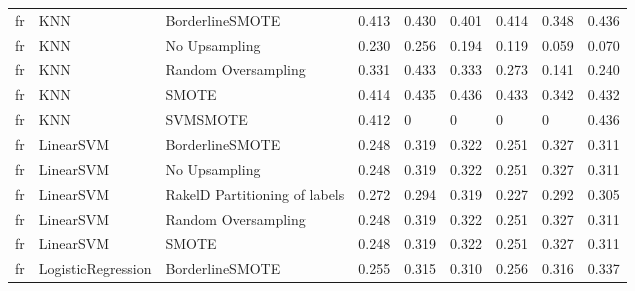 \begin{tabular}{lllllllll}
      fr &                             KNN &               BorderlineSMOTE & 0.413 &                     0.430 &                 0.401 &                  0.414 &                                   0.348 &     0.436 \\
      fr &                             KNN &                 No Upsampling & 0.230 &                     0.256 &                 0.194 &                  0.119 &                                   0.059 &     0.070 \\
      fr &                             KNN &           Random Oversampling & 0.331 &                     0.433 &                 0.333 &                  0.273 &                                   0.141 &     0.240 \\
      fr &                             KNN &                         SMOTE & 0.414 &                     0.435 &                 0.436 &                  0.433 &                                   0.342 &     0.432 \\
      fr &                             KNN &                      SVMSMOTE & 0.412 &                         0 &                     0 &                      0 &                                       0 &     0.436 \\
      fr &                       LinearSVM &               BorderlineSMOTE & 0.248 &                     0.319 &                 0.322 &                  0.251 &                                   0.327 &     0.311 \\
      fr &                       LinearSVM &                 No Upsampling & 0.248 &                     0.319 &                 0.322 &                  0.251 &                                   0.327 &     0.311 \\
      fr &                       LinearSVM & RakelD Partitioning of labels & 0.272 &                     0.294 &                 0.319 &                  0.227 &                                   0.292 &     0.305 \\
      fr &                       LinearSVM &           Random Oversampling & 0.248 &                     0.319 &                 0.322 &                  0.251 &                                   0.327 &     0.311 \\
      fr &                       LinearSVM &                         SMOTE & 0.248 &                     0.319 &                 0.322 &                  0.251 &                                   0.327 &     0.311 \\
      fr &              LogisticRegression &               BorderlineSMOTE & 0.255 &                     0.315 &                 0.310 &                  0.256 &                                   0.316 &     0.337 \\

\end{tabular}
